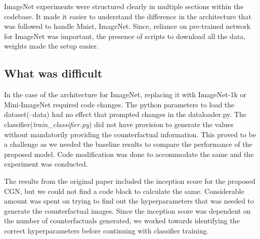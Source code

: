 ImageNet experiments were structured clearly in multiple sections within the codebase. It made it easier to understand the difference in the architecture that was followed to handle Mnist, ImageNet. Since, reliance on pre-trained network for ImageNet was important, the presence of scripts to download all the data, weights made the setup easier.

\subsection{What was difficult}


In the case of the architecture for ImageNet, replacing it with ImageNet-1k or Mini-ImageNet required code changes. The python parameters to load the dataset(--data) had no effect that prompted changes in the dataloader.py.  
The classifier(\textit{train\_classifier.py}) did not have provision to generate the values without mandatorily providing the counterfactual information. This proved to be a challenge as we needed the baseline results to compare the performance of the proposed model. Code modification was done to accommodate the same and the experiment was conducted.

The results from the original paper included the inception score for the proposed CGN, but we could not find a code block to calculate the same. 
Considerable amount was spent on trying to find out the hyperparameters that was needed to generate the counterfactual images. Since the inception score was dependent on the number of counterfactuals generated, we worked towards identifying the correct hyperparameters before continuing with classifier training.

